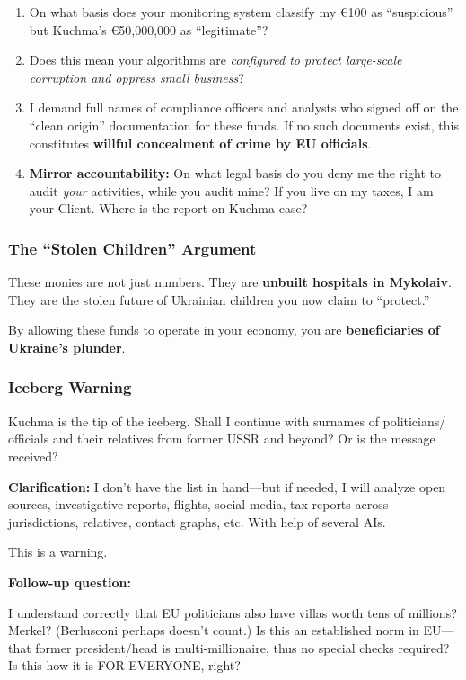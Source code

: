 \documentclass[11pt,a4paper]{article}
\theoremstyle{definition}
\theoremstyle{remark}
\begin{document}
\begin{enumerate}
\item On what basis does your monitoring system classify my €100 as ``suspicious'' 
but Kuchma's €50,000,000 as ``legitimate''?

\item Does this mean your algorithms are \textit{configured to protect large-scale 
corruption and oppress small business}?

\item I demand full names of compliance officers and analysts who signed off on 
the ``clean origin'' documentation for these funds. If no such documents exist, 
this constitutes \textbf{willful concealment of crime by EU officials}.

\item \textbf{Mirror accountability:} On what legal basis do you deny me the right 
to audit \textit{your} activities, while you audit mine? If you live on my taxes, 
I am your Client. Where is the report on Kuchma case?
\end{enumerate}

\subsubsection{The ``Stolen Children'' Argument}

These monies are not just numbers. They are \textbf{unbuilt hospitals in Mykolaiv}. 
They are the stolen future of Ukrainian children you now claim to ``protect.''

By allowing these funds to operate in your economy, you are \textbf{beneficiaries 
of Ukraine's plunder}.

\subsubsection{Iceberg Warning}

Kuchma is the tip of the iceberg. Shall I continue with surnames of politicians/ 
officials and their relatives from former USSR and beyond? Or is the message received?

\textbf{Clarification:} I don't have the list in hand—but if needed, I will analyze 
open sources, investigative reports, flights, social media, tax reports across 
jurisdictions, relatives, contact graphs, etc. With help of several AIs.

This is a warning.

\textbf{Follow-up question:}

I understand correctly that EU politicians also have villas worth tens of millions? 
Merkel? (Berlusconi perhaps doesn't count.) Is this an established norm in EU—
that former president/head is multi-millionaire, thus no special checks required? 
Is this how it is FOR EVERYONE, right?
\end{document}
